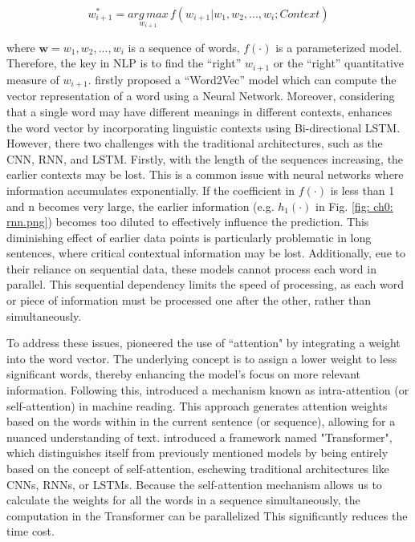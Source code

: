 \begin{equation*}
    w_{i+1}^* = \underset{w_{i+1}}{arg\,max}\,f(w_{i+1} | w_1, w_2, ...,w_i; Context)
\end{equation*}

where $\bm{w} = w_1, w_2, ..., w_{i}$ is a sequence of words, $f(\cdot)$ is a parameterized model. Therefore, the key in NLP is to find the ``right'' $w_{i+1}$ or the ``right'' quantitative measure of $w_{i+1}$. \cite{mikolov-etal2013} firstly proposed a ``Word2Vec'' model which can compute the vector representation of a word using a Neural Network. Moreover, considering that a single word may have different meanings in different contexts, \cite{peter-etal2018} enhances the word vector by incorporating linguistic contexts using Bi-directional LSTM. However, there two challenges with the traditional architectures, such as the CNN, RNN, and LSTM. Firstly, with the length of the sequences increasing, the earlier contexts may be lost. This is a common issue with neural networks where information accumulates exponentially. If the coefficient in $f(\cdot)$ is less than 1 and n becomes very large, the earlier information (e.g. $h_1(\cdot)$ in Fig. \ref{fig: ch0: rnn.png}) becomes too diluted to effectively influence the prediction. This diminishing effect of earlier data points is particularly problematic in long sentences, where critical contextual information may be lost. Additionally, eue to their reliance on sequential data, these models cannot process each word in parallel. This sequential dependency limits the speed of processing, as each word or piece of information must be processed one after the other, rather than simultaneously.

To address these issues, \cite{bahdanau-etal2014} pioneered the use of ``attention" by integrating a weight into the word vector. The underlying concept is to assign a lower weight to less significant words, thereby enhancing the model's focus on more relevant information. Following this, \cite{cheng-etal2016} introduced a mechanism known as intra-attention (or self-attention) in machine reading. This approach generates attention weights based on the words within in the current sentence (or sequence), allowing for a nuanced understanding of text. \cite{vaswani-etal2018} introduced a framework named "Transformer", which distinguishes itself from previously mentioned models by being entirely based on the concept of self-attention, eschewing traditional architectures like CNNs, RNNs, or LSTMs. Because the self-attention mechanism allows us to calculate the weights for all the words in a sequence simultaneously, the computation in the Transformer can be parallelized This significantly reduces the time cost.

